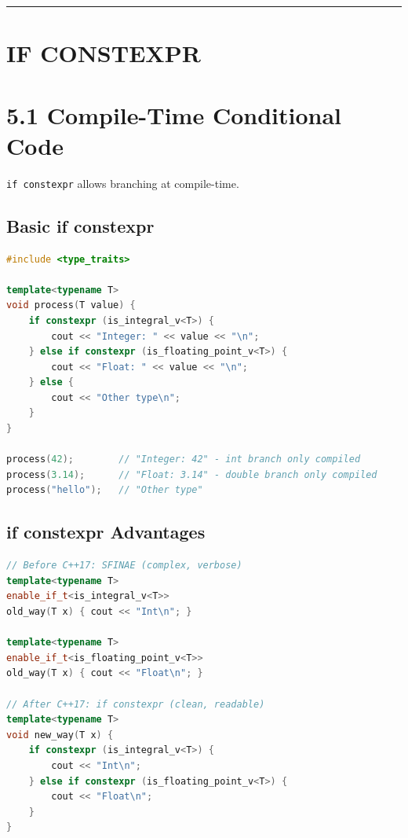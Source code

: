 \begin{center}\rule{0.5\linewidth}{0.5pt}\end{center}

\hypertarget{if-constexpr}{%
\section{IF CONSTEXPR}\label{if-constexpr}}

\hypertarget{compile-time-conditional-code}{%
\section{5.1 Compile-Time Conditional
Code}\label{compile-time-conditional-code}}

\passthrough{\lstinline!if constexpr!} allows branching at compile-time.

\hypertarget{basic-if-constexpr}{%
\subsection{Basic if constexpr}\label{basic-if-constexpr}}

\begin{lstlisting}[language={C++}]
#include <type_traits>

template<typename T>
void process(T value) {
    if constexpr (is_integral_v<T>) {
        cout << "Integer: " << value << "\n";
    } else if constexpr (is_floating_point_v<T>) {
        cout << "Float: " << value << "\n";
    } else {
        cout << "Other type\n";
    }
}

process(42);        // "Integer: 42" - int branch only compiled
process(3.14);      // "Float: 3.14" - double branch only compiled
process("hello");   // "Other type"
\end{lstlisting}

\hypertarget{if-constexpr-advantages}{%
\subsection{if constexpr Advantages}\label{if-constexpr-advantages}}

\begin{lstlisting}[language={C++}]
// Before C++17: SFINAE (complex, verbose)
template<typename T>
enable_if_t<is_integral_v<T>>
old_way(T x) { cout << "Int\n"; }

template<typename T>
enable_if_t<is_floating_point_v<T>>
old_way(T x) { cout << "Float\n"; }

// After C++17: if constexpr (clean, readable)
template<typename T>
void new_way(T x) {
    if constexpr (is_integral_v<T>) {
        cout << "Int\n";
    } else if constexpr (is_floating_point_v<T>) {
        cout << "Float\n";
    }
}
\end{lstlisting}

